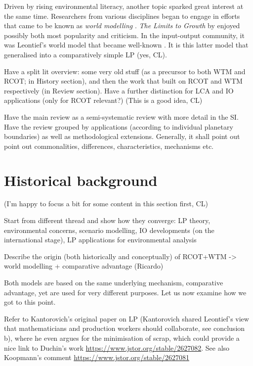 \documentclass{article}
\begin{document}
\begin{refsection}
Driven by rising environmental literacy, another topic sparked great interest at the same time. Researchers from various disciplines began to engage in efforts that came to be known as \textit{world modelling} \parencite{fontela_2004}. \textit{The Limits to Growth} by \textcite{meadows_1972} enjoyed possibly both most popularity and criticism. In the input-output community, it was Leontief's world model that became well-known \parencite{leontief_1970,leontief_1977}. It is this latter model that \textcite{duchin_2005} generalised into a comparatively simple LP (yes, CL).

Have a split lit overview: some very old stuff (as a precursor to both WTM and RCOT; in History section), and then the work that built on RCOT and WTM respectively (in Review section). Have a further distinction for LCA and IO applications (only for RCOT relevant?) (This is a good idea, CL)

Have the main review as a semi-systematic review with more detail in the SI. Have the review grouped by applications (according to individual planetary boundaries) as well as methodological extensions. Generally, it shall point out point out commonalities, differences, characteristics, mechanisms etc.


\section{Historical background}

(I'm happy to focus a bit for some content in this section first, CL)

Start from different thread and show how they converge: LP theory, environmental concerns, scenario modelling, IO developments (on the international stage), LP applications for environmental analysis

Describe the origin (both historically and conceptually) of RCOT+WTM -> world modelling + comparative advantage (Ricardo)

Both models are based on the same underlying mechanism, comparative advantage, yet are used for very different purposes. Let us now examine how we got to this point.

Refer to Kantorovich's original paper on LP (Kantorovich shared Leontief's view that mathematicians and production workers should collaborate, see conclusion b), where he even argues for the minimisation of scrap, which could provide a nice link to Duchin's work \url{https://www.jstor.org/stable/2627082}. See also Koopmann's comment \url{https://www.jstor.org/stable/2627081}


\end{refsection}
\end{document}
